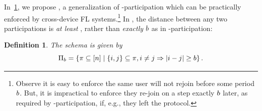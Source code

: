 \documentclass{article}
\newtheorem{definition}{Definition}
\begin{document}
In~\cref{def:bparticipation}, we propose \bparticipation, a generalization of \multiepoch-participation which can be practically enforced by cross-device FL systems.\footnote{Observe it is easy to enforce the same user will not rejoin before some period $b$. But, it is impractical to enforce they re-join on a step exactly $b$ later, as required by \multiepoch-participation, if, e.g., they left the protocol.}
In \bparticipation, the distance between any two participations is \emph{at least} \minsep, rather than \emph{exactly} $b$ as in \multiepoch-participation:
\begin{definition}\label{def:bparticipation}
The \textbf{\bparticipation} schema is given by
\[
  \Pi_{b} = \left\{\pi \subseteq [n]  \mid \{i, j\} \subseteq \pi, i \ne j \Rightarrow |i - j| \ge b\right\}.
\]
\end{definition}
\end{document}
